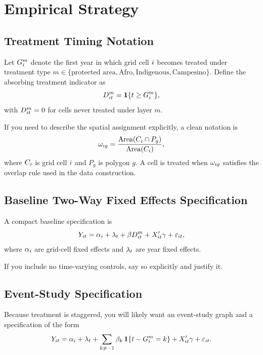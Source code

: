 \section{Empirical Strategy}

\subsection{Treatment Timing Notation}

Let $G_{i}^{m}$ denote the first year in which grid cell $i$ becomes treated under treatment type $m \in \{\text{protected area}, \text{Afro}, \text{Indigenous}, \text{Campesino}\}$. Define the absorbing treatment indicator as
\begin{equation}
    D_{i t}^{m} = \mathbf{1}\{t \geq G_{i}^{m}\},
\end{equation}
with $D_{i t}^{m} = 0$ for cells never treated under layer $m$.

If you need to describe the spatial assignment explicitly, a clean notation is
\begin{equation}
    \omega_{i g} = \frac{\text{Area}(C_{i} \cap P_{g})}{\text{Area}(C_{i})},
\end{equation}
where $C_{i}$ is grid cell $i$ and $P_{g}$ is polygon $g$. A cell is treated when $\omega_{i g}$ satisfies the overlap rule used in the data construction.

\subsection{Baseline Two-Way Fixed Effects Specification}

A compact baseline specification is
\begin{equation}
    Y_{i t} = \alpha_{i} + \lambda_{t} + \beta D_{i t}^{m} + X_{i t}'\gamma + \varepsilon_{i t},
\end{equation}
where $\alpha_{i}$ are grid-cell fixed effects and $\lambda_{t}$ are year fixed effects.

If you include no time-varying controls, say so explicitly and justify it.

\subsection{Event-Study Specification}

Because treatment is staggered, you will likely want an event-study graph and a specification of the form
\begin{equation}
    Y_{i t} = \alpha_{i} + \lambda_{t}
    + \sum_{k \neq -1} \beta_{k}\,\mathbf{1}\{t - G_{i}^{m} = k\}
    + X_{i t}'\gamma
    + \varepsilon_{i t}.
\end{equation}

